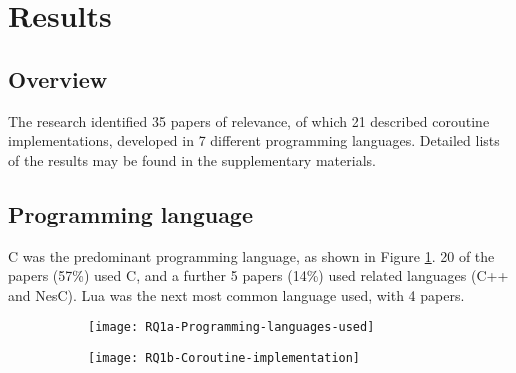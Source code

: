 \section{Results}
\label{section:results}

\subsection{Overview}

The research identified 35 papers of relevance, of which 21 described coroutine implementations, developed in 7 different programming languages. Detailed lists of the results may be found in the supplementary materials.

\subsection{Programming language}

\DIFdelbegin %
{%
}
{%
}
{%
}

\DIFdelend C was the predominant programming language, as shown in Figure \ref{fig:rq1a}. 20 of the papers (57\%) used C, and a further 5 papers (14\%) used related languages (C++ and NesC). Lua was the next most common language used, with 4 papers.

\DIFaddbegin \begin{figure}[h]
	\centering
	\begin{subfigure}[h]{0.48\textwidth}
		\centering
		\texttt{[image: RQ1a-Programming-languages-used]}
		\caption{}
		\label{fig:rq1a}
	\end{subfigure}
	\begin{subfigure}[h]{0.46\textwidth}
		\centering
		\texttt{[image: RQ1b-Coroutine-implementation]}
		\caption{}
		\label{fig:rq1b}
	\end{subfigure}
	\caption{}
\end{figure}

